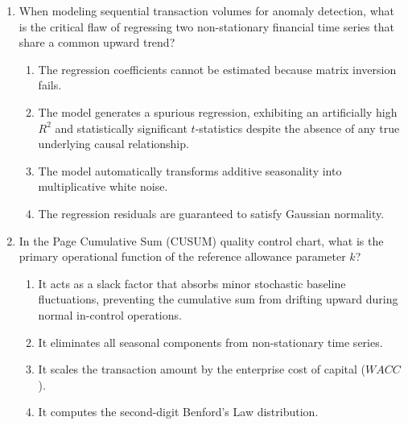 \begin{enumerate}[label=\textbf{MCQ 10.\arabic*}]
    \item When modeling sequential transaction volumes for anomaly detection, what is the critical flaw of regressing two non-stationary financial time series that share a common upward trend?
    \begin{enumerate}[label=(\alph*)]
        \item The regression coefficients cannot be estimated because matrix inversion fails.
        \item The model generates a spurious regression, exhibiting an artificially high $R^2$ and statistically significant $t$-statistics despite the absence of any true underlying causal relationship.
        \item The model automatically transforms additive seasonality into multiplicative white noise.
        \item The regression residuals are guaranteed to satisfy Gaussian normality.
    \end{enumerate}

    \item In the Page Cumulative Sum (CUSUM) quality control chart, what is the primary operational function of the reference allowance parameter $k$?
    \begin{enumerate}[label=(\alph*)]
        \item It acts as a slack factor that absorbs minor stochastic baseline fluctuations, preventing the cumulative sum from drifting upward during normal in-control operations.
        \item It eliminates all seasonal components from non-stationary time series.
        \item It scales the transaction amount by the enterprise cost of capital ($WACC$).
        \item It computes the second-digit Benford's Law distribution.
    \end{enumerate}
\end{enumerate}
